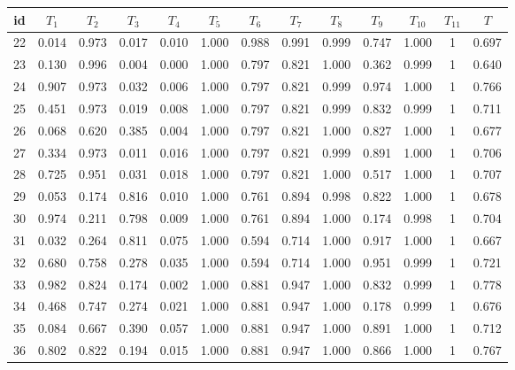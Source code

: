 \documentclass{classrep}
\begin{document}
\begin{center}
  \begin{table}[H]
  \begin{adjustbox}{center=11cm}
    \begin{tabularx}{\textwidth}{ccccccccccccc}
    id & $T_1$ & $T_2$ & $T_3$ & $T_4$ & $T_5$ & $T_6$ & $T_7$ & $T_8$ & $T_9$ & $T_{10}$ & $T_{11}$ & $T$ \\ \hline 
    22	&	0.014	&	0.973	&	0.017	&	0.010	&	1.000	&	0.988	&	0.991	&	0.999	&	0.747	&	1.000	&	1	&	0.697	\\ \hline
23	&	0.130	&	0.996	&	0.004	&	0.000	&	1.000	&	0.797	&	0.821	&	1.000	&	0.362	&	0.999	&	1	&	0.640	\\ \hline
24	&	0.907	&	0.973	&	0.032	&	0.006	&	1.000	&	0.797	&	0.821	&	0.999	&	0.974	&	1.000	&	1	&	0.766	\\ \hline
25	&	0.451	&	0.973	&	0.019	&	0.008	&	1.000	&	0.797	&	0.821	&	0.999	&	0.832	&	0.999	&	1	&	0.711	\\ \hline
26	&	0.068	&	0.620	&	0.385	&	0.004	&	1.000	&	0.797	&	0.821	&	1.000	&	0.827	&	1.000	&	1	&	0.677	\\ \hline
27	&	0.334	&	0.973	&	0.011	&	0.016	&	1.000	&	0.797	&	0.821	&	0.999	&	0.891	&	1.000	&	1	&	0.706	\\ \hline
28	&	0.725	&	0.951	&	0.031	&	0.018	&	1.000	&	0.797	&	0.821	&	1.000	&	0.517	&	1.000	&	1	&	0.707	\\ \hline
29	&	0.053	&	0.174	&	0.816	&	0.010	&	1.000	&	0.761	&	0.894	&	0.998	&	0.822	&	1.000	&	1	&	0.678	\\ \hline
30	&	0.974	&	0.211	&	0.798	&	0.009	&	1.000	&	0.761	&	0.894	&	1.000	&	0.174	&	0.998	&	1	&	0.704	\\ \hline
31	&	0.032	&	0.264	&	0.811	&	0.075	&	1.000	&	0.594	&	0.714	&	1.000	&	0.917	&	1.000	&	1	&	0.667	\\ \hline
32	&	0.680	&	0.758	&	0.278	&	0.035	&	1.000	&	0.594	&	0.714	&	1.000	&	0.951	&	0.999	&	1	&	0.721	\\ \hline
33	&	0.982	&	0.824	&	0.174	&	0.002	&	1.000	&	0.881	&	0.947	&	1.000	&	0.832	&	0.999	&	1	&	0.778	\\ \hline
34	&	0.468	&	0.747	&	0.274	&	0.021	&	1.000	&	0.881	&	0.947	&	1.000	&	0.178	&	0.999	&	1	&	0.676	\\ \hline
35	&	0.084	&	0.667	&	0.390	&	0.057	&	1.000	&	0.881	&	0.947	&	1.000	&	0.891	&	1.000	&	1	&	0.712	\\ \hline
36	&	0.802	&	0.822	&	0.194	&	0.015	&	1.000	&	0.881	&	0.947	&	1.000	&	0.866	&	1.000	&	1	&	0.767	\\ \hline

\end{tabularx}
\end{adjustbox}
\end{table}
\end{center}
\end{document}
